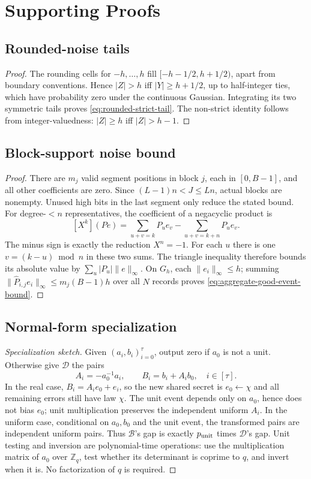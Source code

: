 \section{Supporting Proofs}
\label{app:proofs}
\subsection{Rounded-noise tails}
\label{app:lem-rounded-tail}
\begin{proof}
The rounding cells for \(-h,\ldots,h\) fill
\([-h-1/2,h+1/2)\), apart from boundary conventions. Hence
\(|Z|>h\) iff \(|Y|\ge h+1/2\), up to half-integer ties,
which have probability zero under the continuous Gaussian.
Integrating its two symmetric tails proves \eqref{eq:rounded-strict-tail}.
The non-strict identity follows from integer-valuedness:
\(|Z|\ge h\) iff \(|Z|>h-1\).
\end{proof}

\subsection{Block-support noise bound}
\label{app:lem-block-noise}
\begin{proof}
There are \(m_j\) valid segment positions in block \(j\), each in
\([0,B-1]\), and all other coefficients are zero. Since
\((L-1)n<J\le Ln\), actual blocks are nonempty. Unused high bits in the
last segment only reduce the stated bound.
For degree-\(<n\) representatives, the coefficient of a negacyclic product is
\[
 [X^k](Pe)=\sum_{u+v=k}P_u e_v-\sum_{u+v=k+n}P_u e_v.
\]
The minus sign is exactly the reduction \(X^n=-1\).
For each \(u\) there is one \(v=(k-u)\bmod n\) in these two sums.
The triangle inequality therefore bounds its absolute value by
\(\sum_u|P_u|\|e\|_\infty\).
On \(G_h\), each \(\|e_i\|_\infty\le h\); summing
\(\|\widehat P_{i,j}e_i\|_\infty\le m_j(B-1)h\) over all \(N\) records
proves \eqref{eq:aggregate-good-event-bound}.
\end{proof}

\subsection{Normal-form specialization}
\label{app:normal-form}
\begin{proof}[Specialization sketch]
Given \((a_i,b_i)_{i=0}^{\tau}\), output zero if \(a_0\) is not a unit.
Otherwise give \(\mathcal D\) the pairs
\[
 A_i=-a_0^{-1}a_i,\qquad B_i=b_i+A_i b_0,\quad i\in[\tau].
\]
In the real case, \(B_i=A_i e_0+e_i\), so the new shared secret is
\(e_0\leftarrow\chi\) and all remaining errors still have law \(\chi\).
The unit event depends only on \(a_0\), hence does not bias \(e_0\);
unit multiplication preserves the independent uniform \(A_i\).
In the uniform case, conditional on \(a_0,b_0\) and the unit event,
the transformed pairs are independent uniform pairs.
Thus \(\mathcal B\)'s gap is exactly \(p_{\rm unit}\) times
\(\mathcal D\)'s gap. Unit testing and inversion are polynomial-time
operations: use the multiplication matrix of \(a_0\) over \(\mathbb Z_q\),
test whether its determinant is coprime to \(q\), and invert when it is.
No factorization of \(q\) is required.
\end{proof}


